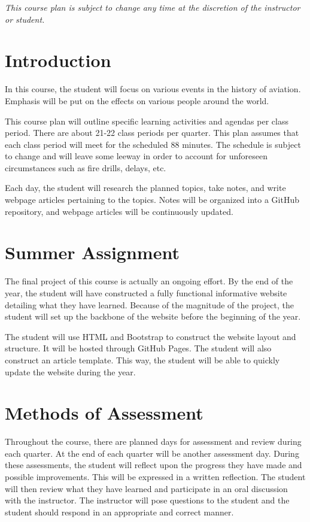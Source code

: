 \documentclass[12pt]{article}
\begin{document}
\newpage
\tableofcontents\newpage

\textit{This course plan is subject to change any time at the discretion of the instructor or student.}

\section*{Introduction}

In this course, the student will focus on various events in the history of aviation. Emphasis
will be put on the effects on various people around the world.

This course plan will outline specific learning activities and agendas per class period.
There are about 21-22 class periods per quarter. This plan assumes that each class period
will meet for the scheduled 88 minutes. The schedule is subject to change and will leave
some leeway in order to account for unforeseen circumstances such as fire drills, delays, etc.

Each day, the student will research the planned topics, take notes, and write webpage
articles pertaining to the topics. Notes will be organized into a GitHub repository, and
webpage articles will be continuously updated.

\section*{Summer Assignment}

The final project of this course is actually an ongoing effort. By the end of the year, the
student will have constructed a fully functional informative website detailing what they have
learned. Because of the magnitude of the project, the student will set up the backbone of
the website before the beginning of the year.

The student will use HTML and Bootstrap to construct the website layout and structure.
It will be hosted through GitHub Pages. The student will also construct an article template.
This way, the student will be able to quickly update the website during the year.

\section*{Methods of Assessment}

Throughout the course, there are planned days for assessment and review during each
quarter. At the end of each quarter will be another assessment day. During these assessments,
the student will reflect upon the progress they have made and possible improvements. This
will be expressed in a written reflection. The student will then review what they have learned
and participate in an oral discussion with the instructor. The instructor will pose questions
to the student and the student should respond in an appropriate and correct manner.
\end{document}

